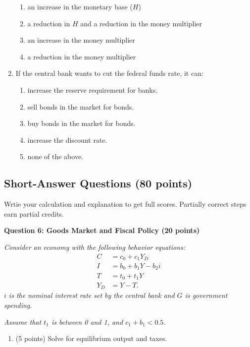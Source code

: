 \documentclass[12pt]{article}
\begin{document}
\begin{enumerate}[label=\arabic*.]
\begin{enumerate}[label=\Alph*.]
        \item an increase in the monetary base ($H$)
        \item a reduction in $H$ and a reduction in the money multiplier
        \item an increase in the money multiplier
        \item a reduction in the money multiplier
    \end{enumerate}
    \item If the central bank wants to cut the federal funds rate, it can:
    \begin{enumerate}[label=\Alph*.]
        \item increase the reserve requirement for banks.
        \item sell bonds in the market for bonds.
        \item buy bonds in the market for bonds. 
        \item increase the discount rate.
        \item none of the above.
    \end{enumerate}
\end{enumerate}

\newpage
\subsection*{Short-Answer Questions (80 points)}
Wrtie your calculation and explanation to get full scores. Partially correct steps earn partial credits.


\textbf{Question 6: Goods Market and Fiscal Policy (20 points)}

\textit{Consider an economy with the following behavior equations:}
\begin{align*}
    C &= c_0 + c_1Y_D\\
    I &= b_0 + b_1Y- b_2i\\
    T &= t_0 + t_1Y\\
    Y_D &= Y- T.
\end{align*}
\textit{$i$ is the nominal interest rate set by the central bank and $G$ is government spending.}

\textit{Assume that $t_1$ is between 0 and 1, and $c_1+b_1<0.5$.}

\begin{enumerate}[label=\alph*.]
    \item (5 points) Solve for equilibrium output and taxes.
\end{enumerate}
\end{document}
